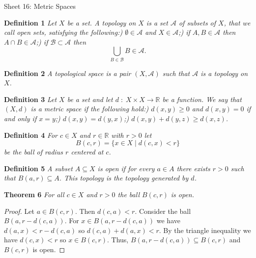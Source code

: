 \documentclass{article}
\begin{document}
\begin{flushleft}

\Large

Sheet 16: Metric Spaces\newline

\normalsize

\textbf{Definition 1}
\textsl{Let $X$ be a set. A topology on $X$ is a set $\mathcal{A}$ of subsets of $X$, that we call open sets, satisfying the following:) $\emptyset \in \mathcal{A}$ and $X \in \mathcal{A}$;) if $A, B \in \mathcal{A}$ then $A \cap B \in \mathcal{A}$;) if $\mathcal{B} \subset \mathcal{A}$ then
\[
\bigcup_{B \in \mathcal{B}} B \in \mathcal{A}.
\]}\newline

\textbf{Definition 2}
\textsl{A topological space is a pair $(X, \mathcal{A})$ such that $\mathcal{A}$ is a topology on $X$.}\newline

\textbf{Definition 3}
\textsl{Let $X$ be a set and let $d \; : \; X \times X \rightarrow \mathbb{R}$ be a function. We say that $(X, d)$ is a metric space if the following hold:) $d(x,y) \geq 0$ and $d(x,y) = 0$ if and only if $x=y$;) $d(x,y) = d(y,x)$;) $d(x,y) + d(y,z) \geq d(x,z)$.}\newline

\textbf{Definition 4}
\textsl{For $c \in X$ and $r \in \mathbb{R}$ with $r > 0$ let
\[
B(c,r) = \{x \in X \mid d(c,x) < r\}
\]
be the ball of radius $r$ centered at $c$.}\newline

\textbf{Definition 5}
\textsl{A subset $A \subseteq X$ is open if for every $a \in A$ there exists $r > 0$ such that $B(a,r) \subseteq A$. This topology is the topology generated by $d$.}\newline

\textbf{Theorem 6}
\textsl{For all $c \in X$ and $r > 0$ the ball $B(c,r)$ is open.}
\begin{proof}
Let $a \in B(c,r)$. Then $d(c,a) < r$. Consider the ball $B(a, r-d(c,a))$. For $x \in B(a, r-d(c,a))$ we have $d(a,x) < r - d(c,a)$ so $d(c,a) + d(a,x) < r$. By the triangle inequality we have $d(c,x) < r$ so $x \in B(c,r)$. Thus, $B(a, r-d(c,a)) \subseteq B(c,r)$ and $B(c,r)$ is open.
\end{proof}


\end{flushleft}
\end{document}

